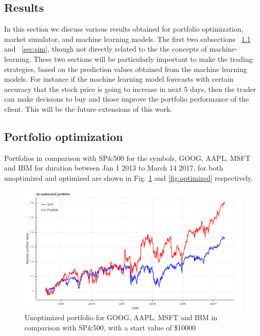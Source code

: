 \documentclass[12pt]{article}
\begin{document}
\begin{itemize}
\section{Results}

In this section we discuss various results obtained for portfolio optimization, market simulator, and machine learning models. The first two subsections ~\ref{sec:opt} and ~\ref{sec:sim}, though not directly related to the the concepts of machine-learning. These two sections will be particularly important to make the trading strategies, based on the prediction values obtained from the machine learning models. For instance if the machine learning model forecasts with certain accuracy that the stock price is going to increase in next 5 days, then the trader can make decisions to buy and those improve the portfolio performance of the client. This will be the future extensions of this work.


\subsection{Portfolio optimization}
\label{sec:opt}

Portfolios in comparison with SP\&500 for the symbols, GOOG, AAPL, MSFT and IBM for duration between Jan 1 2013 to March 14 2017, for both unoptimized and optimized are shown in Fig. \ref{fig:unoptimized} and \ref{fig:optimized} respectively.

\begin{figure}[!htbp]
\begin{center}
\includegraphics[height=0.5\textheight,width=\textwidth]{unoptimized.png}
\caption{Unoptimized portfolio for GOOG, AAPL, MSFT and IBM in comparison with SP\&500, with a start value of \$10000}
\label{fig:unoptimized}
\end{center}
\end{figure}


\end{itemize}
\end{document}
